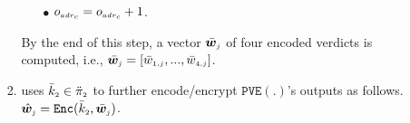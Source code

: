 \begin{enumerate}
\begin{enumerate}
\begin{enumerate}
\begin{enumerate}
%
\item[$\bullet$] $o_{\scriptscriptstyle adr_{\scriptscriptstyle{c}}}=o_{\scriptscriptstyle adr_{\scriptscriptstyle{c}}}+1$.
%
\end{enumerate}
By the end of this step, a vector ${\bar {\bm w}}_{\scriptscriptstyle j}$ of four encoded verdicts is computed, i.e., $\bar {\bm w}_{\scriptscriptstyle j}=[ \bar{  w}_{\scriptscriptstyle 1,j},..., \bar{  w}_{\scriptscriptstyle 4,j}]$.
%
\item uses $\bar k_{\scriptscriptstyle 2}\in \ddot \pi_{\scriptscriptstyle 2}$ to further encode/encrypt  $\mathtt{PVE}(.)$'s outputs as follows. %
%
$ \hat {\bm w}_{\scriptscriptstyle j}= \mathtt{Enc}(\bar k_{\scriptscriptstyle 2}, \bar{\bm w}_{\scriptscriptstyle j})$.


%
%
%
%
%
\end{enumerate}


%
%
%
%



\end{enumerate}
\end{enumerate}
